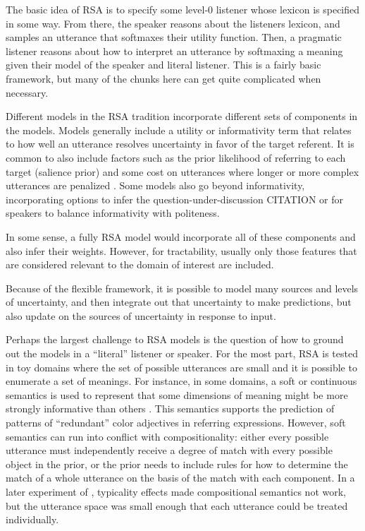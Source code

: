 \documentclass[]{article}
\begin{document}
The basic idea of RSA is to specify some level-0 listener whose lexicon is specified in some way. From there, the speaker reasons about the listeners lexicon, and samples an utterance that softmaxes their utility function. Then, a pragmatic listener reasons about how to interpret an utterance by softmaxing a meaning given their model of the speaker and literal listener. This is a fairly basic framework, but many of the chunks here can get quite complicated when necessary. 

Different models in the RSA tradition incorporate different sets of components in the models. Models generally include a utility or informativity term that relates to how well an utterance resolves uncertainty in favor of the target referent.  It is common to also include factors such as the prior likelihood of referring to each target (salience prior) and some cost on utterances where longer or more complex utterances are penalized \cite{goodman2016}. Some models also go beyond informativity, incorporating options to infer the question-under-discussion CITATION or for speakers to balance informativity with politeness.

In some sense, a fully RSA model would incorporate all of these components and also infer their weights. However, for tractability, usually only those features that are considered relevant to the domain of interest are included.

Because of the flexible framework, it is possible to model many sources and levels of uncertainty, and then integrate out that uncertainty to make predictions, but also update on the sources of uncertainty in response to input. 

Perhaps the largest challenge to RSA models is the question of how to ground out the models in a ``literal'' listener or speaker. For the most part, RSA is tested in toy domains where the set of possible utterances are small and it is possible to enumerate a set of meanings. For instance, in some domains, a soft or continuous semantics is used to represent that some dimensions of meaning might be more strongly informative than others \cite{degen20200406}. This semantics supports the prediction of patterns of ``redundant'' color adjectives in referring expressions. However, soft semantics can run into conflict with compositionality: either every possible utterance must independently receive a degree of match with every possible object in the prior, or the prior needs to include rules for how to determine the match of a whole utterance on the basis of the match with each component. In a later experiment of \cite{degen20200406}, typicality effects made compositional semantics not work, but the utterance space was small enough that each utterance could be treated individually. 
\end{document}
